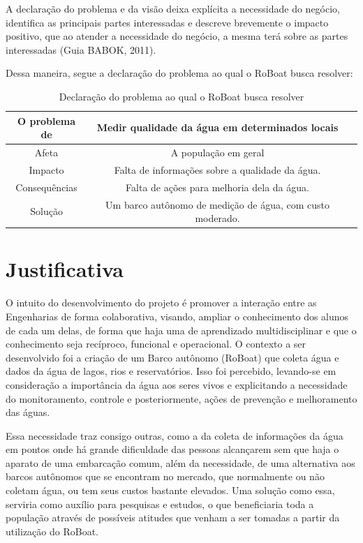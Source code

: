 A declaração do problema e da visão deixa explícita a necessidade do negócio, identifica as principais partes interessadas e descreve brevemente o impacto positivo, que ao atender a necessidade do negócio, a mesma terá sobre as partes interessadas (Guia BABOK, 2011).

Dessa maneira, segue a declaração do problema ao qual o RoBoat busca resolver:

\begin{table}[h]
	\centering
	\label{tab01}	
	\begin{tabular}{ccc}
		\toprule
		\textbf{O problema de} & \textbf{Medir qualidade da água em determinados locais} \\
		\midrule
		Afeta & A população em geral         \\
		Impacto & Falta de informações sobre a qualidade da água.            \\
		Consequências &  Falta de ações para melhoria dela da água.\\
		Solução & Um barco autônomo de medição de água, com custo moderado.               \\
		\bottomrule
	\end{tabular}	
	\caption{Declaração do problema ao qual o RoBoat busca resolver}
\end{table}


\section{Justificativa}



O intuito do desenvolvimento do projeto é promover a interação entre as Engenharias de forma colaborativa, visando, ampliar o conhecimento dos alunos de cada um delas, de forma que haja uma de aprendizado multidisciplinar e que o conhecimento seja recíproco, funcional e operacional. 
O contexto a ser desenvolvido foi a criação de um Barco autônomo (RoBoat) que coleta água e dados da água de lagos, rios e reservatórios. Isso foi percebido, levando-se em consideração a importância da água aos seres vivos e explicitando a necessidade do monitoramento, controle e posteriormente, ações de prevenção e melhoramento das águas. 

Essa necessidade traz consigo outras, como a da coleta de informações da água em pontos onde há grande dificuldade das pessoas alcançarem sem que haja o aparato de uma embarcação comum, além da necessidade, de uma alternativa aos barcos autônomos que se encontram no mercado, que normalmente ou não coletam água, ou tem seus custos bastante elevados. Uma solução como essa, serviria como auxílio para pesquisas e estudos, o que beneficiaria toda a população através de possíveis atitudes que venham a ser tomadas a partir da utilização do RoBoat.


